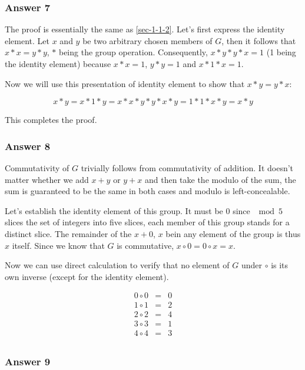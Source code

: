 \documentclass[11pt]{article}
\begin{document}
\subsubsection{Answer 7}
\label{sec-1-3-1}
The proof is essentially the same as \ref{sec-1-1-2}.  Let's first express the
identity element.  Let $x$ and $y$ be two arbitrary chosen members of $G$, then
it follows that $x*x=y*y$, $*$ being the group operation.  Consequently,
$x*y*y*x=1$ (1 being the identity element) because $x*x=1$, $y*y=1$ and $x*1*x=1$.

Now we will use this presentation of identity element to show that $x*y=y*x$:

\begin{equation*}
  x*y=x*1*y=x*x*y*y*x*y=1*1*x*y=x*y
\end{equation*}

This completes the proof.
\subsubsection{Answer 8}
\label{sec-1-3-2}
Commutativity of $G$ trivially follows from commutativity of addition.  It doesn't
matter whether we add $x+y$ or $y+x$ and then take the modulo of the sum, the sum
is guaranteed to be the same in both cases and modulo is left-concealable.

Let's establish the identity element of this group.  It must be 0 since $\mod 5$
slices the set of integers into five slices, each member of this group stands for
a distinct slice.  The remainder of the $x+0$, $x$ bein any element of the group
is thus $x$ itself.  Since we know that $G$ is commutative,
$x \circ 0 = 0 \circ x = x$.

Now we can use direct calculation to verify that no element of $G$ under $\circ$
is its own inverse (except for the identity element).

\begin{equation*}
  \begin{array}{lll}
    0 \circ 0 & = & 0 \\
    1 \circ 1 & = & 2 \\
    2 \circ 2 & = & 4 \\
    3 \circ 3 & = & 1 \\
    4 \circ 4 & = & 3 \\
  \end{array}
\end{equation*}
\subsubsection{Answer 9}
\label{sec-1-3-3}
\end{document}
